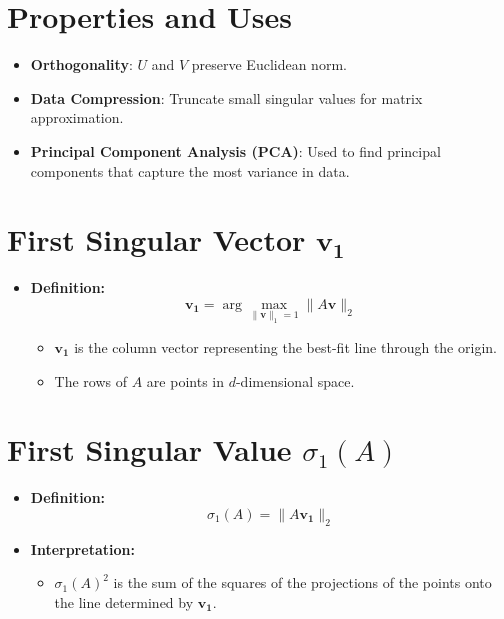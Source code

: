 \documentclass{article}
\begin{document}
\section*{Properties and Uses}
\begin{itemize}
    \item \textbf{Orthogonality}: \( U \) and \( V \) preserve Euclidean norm.
    \item \textbf{Data Compression}: Truncate small singular values for matrix approximation.
    \item \textbf{Principal Component Analysis (PCA)}: Used to find principal components that capture the most variance in data.
\end{itemize}











\section*{First Singular Vector \( \mathbf{v_1} \)}

\begin{itemize}
    \item \textbf{Definition:}
    \[
    \mathbf{v_1} = \arg \max_{\|\mathbf{v}\|_1=1} \|A\mathbf{v}\|_2
    \]
    \begin{itemize}
        \item \( \mathbf{v_1} \) is the column vector representing the best-fit line through the origin.
        \item The rows of \( A \) are points in \( d \)-dimensional space.
    \end{itemize}
\end{itemize}

\section*{First Singular Value \( \sigma_1(A) \)}

\begin{itemize}
    \item \textbf{Definition:}
    \[
    \sigma_1(A) = \|A\mathbf{v_1}\|_2
    \]
    \item \textbf{Interpretation:}
    \begin{itemize}
        \item \( \sigma_1(A)^2 \) is the sum of the squares of the projections of the points onto the line determined by \( \mathbf{v_1} \).
    \end{itemize}
\end{itemize}
\end{document}
